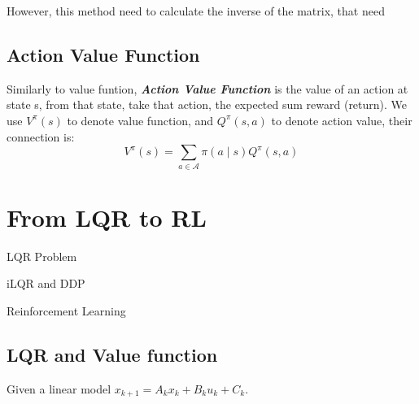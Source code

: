 \documentclass[10pt]{elegantbook}
\newcommand{\mydefination}[1]{\textbf{\textit{\textcolor{structurecolor}{#1}}}}
\begin{document}
However, this method need to calculate the inverse of the matrix, that need

\section{Action Value Function}
Similarly to value funtion, \mydefination{Action Value Function} is the value of an action at state s, from that state, take that action, the expected sum reward (return). We use $V^{\pi}(s)$ to denote value function, 
and $Q^{\pi}(s,a)$ to denote action value, their connection is:
\begin{equation}
    V^{\pi}(s) = \sum_{a \in \mathcal A}\pi(a\mid s) Q^{\pi}(s,a)
\end{equation} 

\chapter{From LQR to RL}

\begin{introduction}
    \item LQR Problem
    \item iLQR and DDP
    \item Reinforcement Learning
\end{introduction}

\section{LQR and Value function}

Given a linear model $x_{k+1} = A_k x_k + B_k u_k + C_k$.
\end{document}
